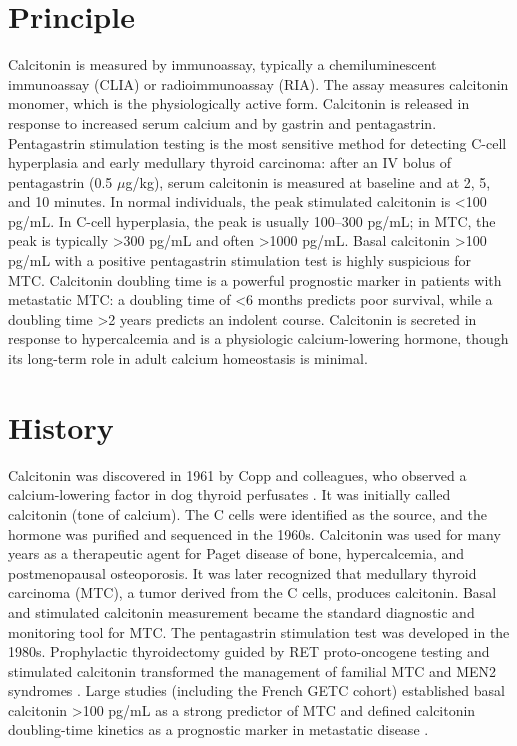 \section*{Principle}
Calcitonin is measured by immunoassay, typically a chemiluminescent immunoassay (CLIA) or radioimmunoassay (RIA). The assay measures calcitonin monomer, which is the physiologically active form. Calcitonin is released in response to increased serum calcium and by gastrin and pentagastrin. Pentagastrin stimulation testing is the most sensitive method for detecting C-cell hyperplasia and early medullary thyroid carcinoma: after an IV bolus of pentagastrin (0.5 $\mu$g/kg), serum calcitonin is measured at baseline and at 2, 5, and 10 minutes. In normal individuals, the peak stimulated calcitonin is <100 pg/mL. In C-cell hyperplasia, the peak is usually 100--300 pg/mL; in MTC, the peak is typically >300 pg/mL and often >1000 pg/mL. Basal calcitonin >100 pg/mL with a positive pentagastrin stimulation test is highly suspicious for MTC. Calcitonin doubling time is a powerful prognostic marker in patients with metastatic MTC: a doubling time of <6 months predicts poor survival, while a doubling time >2 years predicts an indolent course. Calcitonin is secreted in response to hypercalcemia and is a physiologic calcium-lowering hormone, though its long-term role in adult calcium homeostasis is minimal.

\section*{History}
Calcitonin was discovered in 1961 by Copp and colleagues, who observed a calcium-lowering factor in dog thyroid perfusates \cite{copp1962}. It was initially called calcitonin (tone of calcium). The C cells were identified as the source, and the hormone was purified and sequenced in the 1960s. Calcitonin was used for many years as a therapeutic agent for Paget disease of bone, hypercalcemia, and postmenopausal osteoporosis. It was later recognized that medullary thyroid carcinoma (MTC), a tumor derived from the C cells, produces calcitonin. Basal and stimulated calcitonin measurement became the standard diagnostic and monitoring tool for MTC. The pentagastrin stimulation test was developed in the 1980s. Prophylactic thyroidectomy guided by RET proto-oncogene testing and stimulated calcitonin transformed the management of familial MTC and MEN2 syndromes \cite{wells2015}. Large studies (including the French GETC cohort) established basal calcitonin >100 pg/mL as a strong predictor of MTC and defined calcitonin doubling-time kinetics as a prognostic marker in metastatic disease \cite{barbet2005}.

